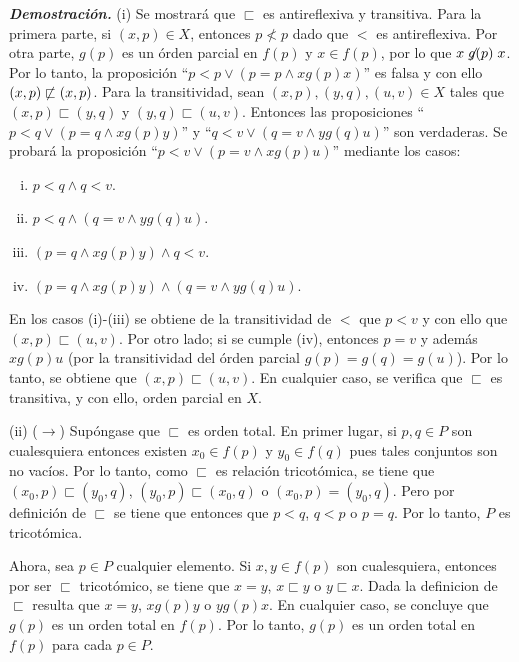 \documentclass[11pt]{article}
\begin{document}
    \textbf{\textit{Demostración.}} (i) Se mostrará que $\sqsubset$ es antireflexiva y transitiva. Para la primera parte, si $(x,p) \in X$, entonces $p \not< p$ dado que $<$ es antireflexiva. Por otra parte, $g(p)$ es un órden parcial en $f(p)$ y $x \in f(p)$, por lo que $x \not\mathrel{g(p)} x$. Por lo tanto, la proposición ``$p < p \lor (p=p \land x \mathrel{g(p)} x)$'' es falsa y con ello $(x,p) \not\mathrel{\sqsubset} (x,p)$.
    Para la transitividad, sean $(x,p),(y,q),(u,v) \in X$ tales que $(x,p) \sqsubset (y,q)$ y $(y,q) \sqsubset (u,v)$. Entonces las proposiciones ``$p<q \lor (p=q \land x \mathrel{g(p)} y)$'' y ``$q<v \lor (q=v \land y \mathrel{g(q)} u)$'' son verdaderas. Se probará la proposición ``$p<v \lor (p=v \land x \mathrel{g(p)} u)$'' mediante los casos:
    \begin{multicols}{2}
        \begin{enumerate}[i)]
            \item $p<q \land q<v$.
            \item $p<q \land ( q=v \land y \mathrel{g(q)} u )$.
            \item $(p=q \land x \mathrel{g(p)} y) \land q<v$.
            \item $(p=q \land x \mathrel{g(p)} y) \land (q=v \land y \mathrel{g(q)} u)$.
        \end{enumerate}
    \end{multicols}
    En los casos (i)-(iii) se obtiene de la transitividad de $<$ que $p<v$ y con ello que $(x,p) \sqsubset (u,v)$. Por otro lado; si se cumple (iv), entonces $p=v$ y además $x \mathrel{g(p)} u$ (por la transitividad del órden parcial $g(p)=g(q)=g(u)$). Por lo tanto, se obtiene que $(x,p) \sqsubset (u,v)$. En cualquier caso, se verifica que $\sqsubset$ es transitiva, y con ello, orden parcial en $X$.
    \medskip

    (ii) ($\rightarrow$) Supóngase que $\sqsubset$ es orden total. En primer lugar, si $p,q \in P$ son cualesquiera entonces existen $x_0\in f(p)$ y $y_0 \in f(q)$ pues tales conjuntos son no vacíos. Por lo tanto, como $\sqsubset$ es relación tricotómica, se tiene que $(x_0,p) \sqsubset (y_0,q)$, $(y_0,p) \sqsubset (x_0,q)$ o $(x_0,p)=(y_0,q)$. Pero por definición de $\sqsubset$ se tiene que entonces que $p<q$, $q<p$ o $p=q$. Por lo tanto, $P$ es tricotómica.
    
    Ahora, sea $p \in P$ cualquier elemento. Si $x,y \in f(p)$ son cualesquiera, entonces por ser $\sqsubset$ tricotómico, se tiene que $x=y$, $x \sqsubset y$ o $y \sqsubset x$. Dada la definicion de $\sqsubset$ resulta que $x=y$, $x \mathrel{g(p)} y$ o $y \mathrel{g(p)} x$. En cualquier caso, se concluye que $g(p)$ es un orden total en $f(p)$. Por lo tanto, $g(p)$ es un orden total en $f(p)$ para cada $p \in P$.
\end{document}
